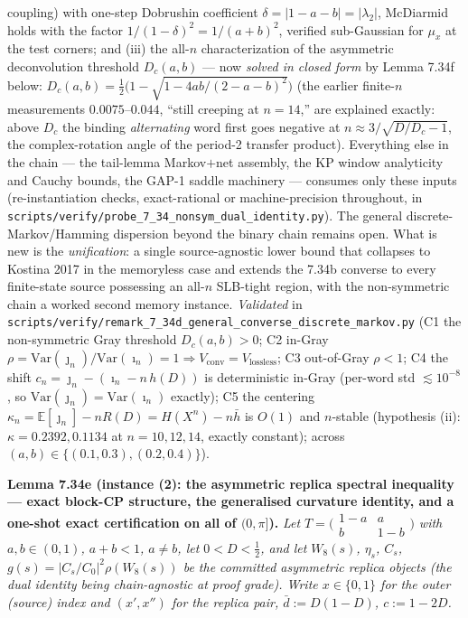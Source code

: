 \documentclass[
]{article}
\begin{document}
coupling) with one-step Dobrushin coefficient $\delta=|1-a-b|=|\lambda_2|$, McDiarmid holds with the
factor $1/(1-\delta)^2=1/(a+b)^2$, verified sub-Gaussian for $\mu_x$ at the test corners; and (iii) the
all-$n$ characterization of the asymmetric deconvolution threshold $D_c(a,b)$ --- now \emph{solved in
closed form} by Lemma 7.34f below: $D_c(a,b)=\tfrac12\bigl(1-\sqrt{1-4ab/(2-a-b)^2}\bigr)$ (the earlier
finite-$n$ measurements $0.0075$--$0.044$, ``still creeping at $n=14$,'' are explained exactly: above
$D_c$ the binding \emph{alternating} word first goes negative at $n\approx3/\sqrt{D/D_c-1}$, the
complex-rotation angle of the period-2 transfer product).
Everything else in the chain --- the tail-lemma Markov$+$net assembly, the KP window analyticity and
Cauchy bounds, the GAP-1 saddle machinery --- consumes only these inputs (re-instantiation checks,
exact-rational or machine-precision throughout, in
\texttt{scripts/verify/probe\_7\_34\_nonsym\_dual\_identity.py}). The general
discrete-Markov/Hamming dispersion beyond the binary chain remains open. What is new is the \emph{unification}: a single source-agnostic lower bound that
collapses to Kostina 2017 in the memoryless case and extends the 7.34b converse to every finite-state
source possessing an all-$n$ SLB-tight region, with the non-symmetric chain a worked second memory
instance. \emph{Validated} in
\texttt{scripts/verify/remark\_7\_34d\_general\_converse\_discrete\_markov.py} (C1 the non-symmetric
Gray threshold $D_c(a,b)>0$; C2 in-Gray $\rho=\mathrm{Var}(\jmath_n)/\mathrm{Var}(\imath_n)=1\Rightarrow V_{\mathrm{conv}}=V_{\mathrm{lossless}}$;
C3 out-of-Gray $\rho<1$; C4 the shift $c_n=\jmath_n-(\imath_n-n\,h(D))$ is deterministic in-Gray
(per-word std $\lesssim10^{-8}$, so $\mathrm{Var}(\jmath_n)=\mathrm{Var}(\imath_n)$ exactly); C5 the
centering $\kappa_n=\mathbb E[\jmath_n]-nR(D)=H(X^n)-n\bar h$ is $O(1)$ and $n$-stable (hypothesis (ii):
$\kappa=0.2392,0.1134$ at $n=10,12,14$, exactly constant); across $(a,b)\in\{(0.1,0.3),(0.2,0.4)\}$).

\textbf{Lemma 7.34e (instance (2): the asymmetric replica spectral
inequality --- exact block-CP structure, the generalised curvature
identity, and a one-shot exact certification on all of $(0,\pi]$).}
\emph{Let $T=\bigl(\begin{smallmatrix}1-a&a\\ b&1-b\end{smallmatrix}\bigr)$
with $a,b\in(0,1)$, $a+b<1$, $a\ne b$, let $0<D<\tfrac12$, and let
$W_8(s)$, $\eta_s$, $C_s$, $g(s)=|C_s/C_0|^2\rho(W_8(s))$ be the committed
asymmetric replica objects (the dual identity being chain-agnostic at proof
grade). Write $x\in\{0,1\}$ for the outer (source) index and $(x',x'')$ for
the replica pair, $\bar d:=D(1-D)$, $c:=1-2D$.}
\end{document}
